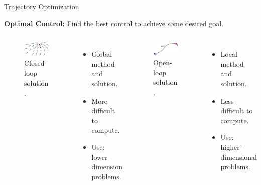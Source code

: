 \documentclass{thesisbeamer}
\begin{document}
\begin{frame}[t]{Trajectory Optimization}

\textbf{Optimal Control:} Find the best control to achieve some desired goal.

\begin{columns}
\begin{figure}
\centering
\includegraphics[width=\textwidth]{Images/Trajectory/closed_loop_solution}
\caption{Closed-loop solution \cite{Kelly2017}.}
\end{figure}

\begin{itemize}
	\item Global method and solution.
	\item More difficult to compute.
	\item Use: lower-dimension problems.
\end{itemize}

\begin{figure}
\centering
\includegraphics[width=\textwidth]{Images/Trajectory/open_loop_solution}
\caption{Open-loop solution \cite{Kelly2017}.}
\end{figure}

\begin{itemize}
	\item Local method and solution.
	\item Less difficult to compute.
	\item Use: higher-dimensional problems.
\end{itemize}



\end{columns}




\end{frame}
\end{document}
